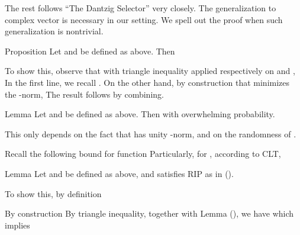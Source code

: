 \startsection [title={DS for Complex Vectors}]

The rest follows ``The Dantzig Selector'' very closely.
The generalization to complex vector is necessary in our setting.
We spell out the proof when such generalization is nontrivial.

\Result
{Proposition}
{
Let  and  be defined as above.
Then
}

To show this, observe that with triangle inequality applied respectively on  and ,
In the first line, we recall .
On the other hand, by construction that  minimizes the -norm,
The result follows by combining.

\Result
{Lemma}
{
Let  and  be defined as above.
Then
with overwhelming probability.
}

This only depends on the fact that  has unity -norm, and on the randomness of .

Recall the following bound for  function
Particularly, for , according to CLT,

\color[red]{(To be done)}

\Result
{Lemma}
{
Let  and  be defined as above, and  satisfies RIP as in ().
}

To show this, by definition

By construction
By triangle inequality, together with Lemma (), we have
which implies

